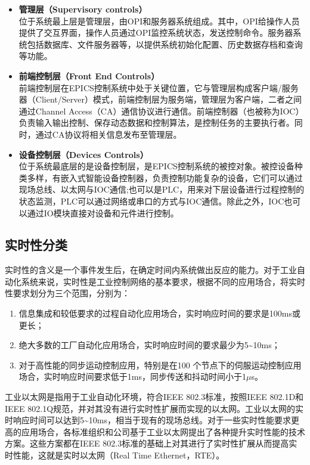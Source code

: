 \begin{itemize}
	\item \textbf{管理层（Supervisory controls）} \\ 
	位于系统最上层是管理层，由OPI和服务器系统组成。其中，OPI给操作人员提供了交互界面，操作人员通过OPI监控系统状态，发送控制命令。服务器系统包括数据库、文件服务器等，以提供系统初始化配置、历史数据存档和查询等功能。
	\item \textbf{前端控制层（Front End Controls）} \\ 
	前端控制层在EPICS控制系统中处于关键位置，它与管理层构成客户端/服务器（Client/Server）模式，前端控制层为服务端，管理层为客户端，二者之间通过Channel Access（CA）通信协议进行通信。前端控制器（也被称为IOC）负责输入输出控制、保存动态数据和控制算法，是控制任务的主要执行者。同时，通过CA协议将相关信息发布至管理层。
	\item \textbf{设备控制层（Devices Controls）} \\ 
	位于系统最底层的是设备控制层，是EPICS控制系统的被控对象。被控设备种类多样，有嵌入式智能设备控制器，负责控制功能复杂的设备，它们可以通过现场总线、以太网与IOC通信;也可以是PLC，用来对下层设备进行过程控制的状态监测，PLC可以通过网络或串口的方式与IOC通信。除此之外，IOC也可以通过IO模块直接对设备和元件进行控制。
\end{itemize}

\subsection{实时性分类}
实时性的含义是一个事件发生后，在确定时间内系统做出反应的能力。对于工业自动化系统来说，实时性是工业控制网络的基本要求，根据不同的应用场合，将实时性要求划分为三个范围，分别为：

\begin{enumerate}[itemindent=1em,label=(\arabic*)]
	\item 信息集成和较低要求的过程自动化应用场合，实时响应时间的要求是100ms或更长；
	\item 绝大多数的工厂自动化应用场合，实时响应时间的要求最少为5\textasciitilde10ms；
	\item 对于高性能的同步运动控制应用，特别是在100 个节点下的伺服运动控制应用场合，实时响应时间要求低于1ms，同步传送和抖动时间小于1$\mu$s\cite{liao-2005}。
\end{enumerate}

工业以太网是指用于工业自动化环境，符合IEEE 802.3标准，按照IEEE 802.1D和IEEE 802.1Q规范，并对其没有进行实时性扩展而实现的以太网。工业以太网的实时响应时间可以达到5\textasciitilde10ms，相当于现有的现场总线。对于一些实时性能要求更高的应用场合，各标准组织和公司基于工业以太网提出了各种提升实时性能的技术方案。这些方案都在IEEE 802.3标准的基础上对其进行了实时性扩展从而提高实时性能，这就是实时以太网（Real Time Ethernet，RTE）。

